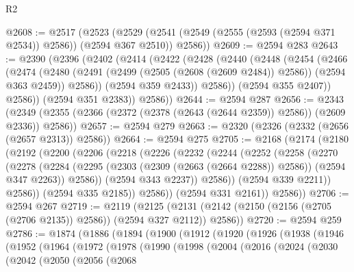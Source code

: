 \begin{lexlean}{R2}
\begin{coremodule}
@2608 := @2517
    (@2523
      (@2529 (@2541 (@2549 (@2555 (@2593 (@2594 @371 @2534)) @2586)) (@2594 @367 @2510)) @2586))
@2609 := @2594 @283
@2643 := @2390
    (@2396
      (@2402
        (@2414
          (@2422
            (@2428
              (@2440
                (@2448
                  (@2454
                    (@2466
                      (@2474
                        (@2480
                          (@2491 (@2499 (@2505 (@2608 (@2609 @2484)) @2586)) (@2594 @363 @2459))
                          @2586))
                      (@2594 @359 @2433))
                    @2586))
                (@2594 @355 @2407))
              @2586))
          (@2594 @351 @2383))
        @2586))
@2644 := @2594 @287
@2656 := @2343
    (@2349 (@2355 (@2366 (@2372 (@2378 (@2643 (@2644 @2359)) @2586)) (@2609 @2336)) @2586))
@2657 := @2594 @279
@2663 := @2320 (@2326 (@2332 (@2656 (@2657 @2313)) @2586))
@2664 := @2594 @275
@2705 := @2168
    (@2174
      (@2180
        (@2192
          (@2200
            (@2206
              (@2218
                (@2226
                  (@2232
                    (@2244
                      (@2252
                        (@2258
                          (@2270
                            (@2278
                              (@2284
                                (@2295
                                  (@2303 (@2309 (@2663 (@2664 @2288)) @2586))
                                  (@2594 @347 @2263))
                                @2586))
                            (@2594 @343 @2237))
                          @2586))
                      (@2594 @339 @2211))
                    @2586))
                (@2594 @335 @2185))
              @2586))
          (@2594 @331 @2161))
        @2586))
@2706 := @2594 @267
@2719 := @2119
    (@2125 (@2131 (@2142 (@2150 (@2156 (@2705 (@2706 @2135)) @2586)) (@2594 @327 @2112)) @2586))
@2720 := @2594 @259
@2786 := @1874
    (@1886
      (@1894
        (@1900
          (@1912
            (@1920
              (@1926
                (@1938
                  (@1946
                    (@1952
                      (@1964
                        (@1972
                          (@1978
                            (@1990
                              (@1998
                                (@2004
                                  (@2016
                                    (@2024
                                      (@2030
                                        (@2042
                                          (@2050
                                            (@2056
                                              (@2068

\end{coremodule}
\end{lexlean}
